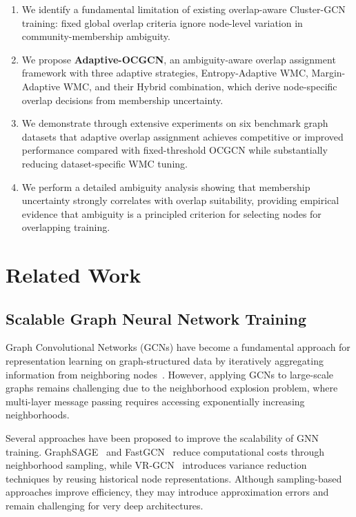 \documentclass[a4paper,11pt,oneside,onecolumn,preprint]{elsarticle}
\numberwithin{equation}{section}
\begin{document}
\begin{enumerate}
  \item We identify a fundamental limitation of existing overlap-aware Cluster-GCN training: fixed global overlap criteria ignore node-level variation in community-membership ambiguity.
  
  \item We propose \textbf{Adaptive-OCGCN}, an ambiguity-aware overlap assignment framework with three adaptive strategies, Entropy-Adaptive WMC, Margin-Adaptive WMC, and their Hybrid combination, which derive node-specific overlap decisions from membership uncertainty.
  
  \item We demonstrate through extensive experiments on six benchmark graph datasets that adaptive overlap assignment achieves competitive or improved performance compared with fixed-threshold OCGCN while substantially reducing dataset-specific WMC tuning.
  
  \item We perform a detailed ambiguity analysis showing that membership uncertainty strongly correlates with overlap suitability, providing empirical evidence that ambiguity is a principled criterion for selecting nodes for overlapping training.
\end{enumerate}

\section{Related Work}
\label{sec:related}


\subsection{Scalable Graph Neural Network Training}

Graph Convolutional Networks (GCNs) have become a fundamental approach for representation learning on graph-structured data by iteratively aggregating information from neighboring nodes~\cite{kipf2017semi}.
However, applying GCNs to large-scale graphs remains challenging due to the neighborhood explosion problem, where multi-layer message passing requires accessing exponentially increasing neighborhoods.

Several approaches have been proposed to improve the scalability of GNN training.
GraphSAGE~\cite{GraphSAGE} and FastGCN~\cite{chen2018fastgcn} reduce computational costs through neighborhood sampling, while VR-GCN~\cite{dai2018learning} introduces variance reduction techniques by reusing historical node representations.
Although sampling-based approaches improve efficiency, they may introduce approximation errors and remain challenging for very deep architectures.
\end{document}
